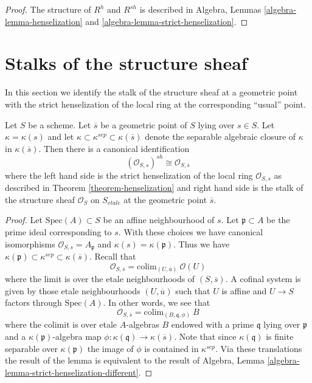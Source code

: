 \begin{proof}
The structure of $R^h$ and $R^{sh}$ is described in
Algebra, Lemmas \ref{algebra-lemma-henselization} and
\ref{algebra-lemma-strict-henselization}.
\end{proof}





\section{Stalks of the structure sheaf}
\label{section-stalks-structure-sheaf}

\noindent
In this section we identify the stalk of the structure sheaf at a geometric
point with the strict henselization of the local ring at the corresponding
``usual'' point.

\begin{lemma}
\label{lemma-describe-etale-local-ring}
Let $S$ be a scheme.
Let $\overline{s}$ be a geometric point of $S$ lying over $s \in S$.
Let $\kappa = \kappa(s)$ and let
$\kappa \subset \kappa^{sep} \subset \kappa(\overline{s})$ denote
the separable algebraic closure of $\kappa$ in $\kappa(\overline{s})$.
Then there is a canonical identification
$$
(\mathcal{O}_{S, s})^{sh}
\cong
\mathcal{O}_{S, \overline{s}}
$$
where the left hand side is the strict henselization of the local ring
$\mathcal{O}_{S, s}$ as described in
Theorem \ref{theorem-henselization}
and right hand side is the stalk of the structure sheaf
$\mathcal{O}_S$ on $S_{etale}$ at
the geometric point $\overline{s}$.
\end{lemma}

\begin{proof}
Let $\text{Spec}(A) \subset S$ be an affine neighbourhood of $s$.
Let $\mathfrak p \subset A$ be the prime ideal corresponding to $s$.
With these choices we have canonical isomorphisms
$\mathcal{O}_{S, s} = A_{\mathfrak p}$ and $\kappa(s) = \kappa(\mathfrak p)$.
Thus we have
$\kappa(\mathfrak p) \subset \kappa^{sep} \subset \kappa(\overline{s})$.
Recall that
$$
\mathcal{O}_{S, \overline{s}} =
\text{colim}_{(U, \overline{u})}\ \mathcal{O}(U)
$$
where the limit is over the etale neighbourhoods of $(S, \overline{s})$.
A cofinal system is given by those etale neighbourhoods $(U, \overline{u})$
such that $U$ is affine and $U \to S$ factors through $\text{Spec}(A)$.
In other words, we see that
$$
\mathcal{O}_{S, \overline{s}} = \text{colim}_{(B, \mathfrak q, \phi)}\ B
$$
where the colimit is over etale $A$-algebras $B$ endowed with a prime
$\mathfrak q$ lying over $\mathfrak p$ and a
$\kappa(\mathfrak p)$-algebra map
$\phi : \kappa(\mathfrak q) \to \kappa(\overline{s})$.
Note that since $\kappa(\mathfrak q)$ is finite separable over
$\kappa(\mathfrak p)$ the image of $\phi$ is contained in $\kappa^{sep}$.
Via these translations the result of the lemma is equivalent
to the result of
Algebra, Lemma \ref{algebra-lemma-strict-henselization-different}.
\end{proof}

